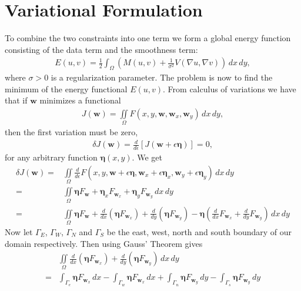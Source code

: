 \chapter{Variational Formulation}
To combine the two constraints into one term we form a global energy function consisting of the data term and the smoothness term:
\begin{align}
E(u,v) = \frac{1}{2} \int_\Omega (M(u,v) + \frac{1}{\sigma^2} V(\nabla u, \nabla v)) \, dx \, dy,
\end{align}
where $\sigma > 0$ is a regularization parameter. The problem is now to find the minimum of the energy functional $E(u,v)$. From calculus of variations we have that if $\textbf{w}$ minimizes a functional
\begin{align*}
J(\textbf{w}) = \iint \limits_\Omega F(x,y,\textbf{w},\textbf{w}_x,\textbf{w}_y) \, dx \, dy,
\end{align*} 
then the first variation must be zero,
\begin{align*}
\delta J(\textbf{w}) = \frac{d}{d \epsilon} \left[ J(\textbf{w} + \epsilon \bm{\eta}) \right] = 0,
\end{align*}
for any arbitrary function $\bm{\eta}(x,y)$. We get
\begin{align*}
\delta J(\textbf{w}) =&  \iint \limits_{\Omega} \frac{d}{d \epsilon} F(x,y,\textbf{w} + \epsilon \bm{\eta}, \textbf{w}_x + \epsilon \bm{\eta}_x, \textbf{w}_y + \epsilon \bm{\eta}_y) \, dx \, dy \\
=&  \iint \limits_{\Omega} \bm{\eta} F_\textbf{w} + \bm{\eta}_x F_{\textbf{w}_x} + \bm{\eta}_y F_{\textbf{w}_y} \, dx \, dy \\
=& \iint \limits_{\Omega} \bm{\eta} F_\textbf{w} + \frac{d}{d x} (\bm{\eta} F_{\textbf{w}_x}) + \frac{d }{d y} (\bm{\eta} F_{\textbf{w}_y}) - \bm{\eta} \left( \frac{d}{d x} F_{\textbf{w}_x} + \frac{d }{d y} F_{\textbf{w}_y} \right) \, dx \, dy
\end{align*}
Now let $\Gamma_{E}$, $\Gamma_{W}$, $\Gamma_{N}$ and $\Gamma_{S}$ be the east, west, north and south boundary of our domain respectively. Then using Gauss' Theorem gives
\begin{align*}
& \iint \limits_{\Omega}  \frac{d}{d x} (\bm{\eta} F_{\textbf{w}_x}) + \frac{d }{d y} (\bm{\eta} F_{\textbf{w}_y}) \, dx \, dy \\ 
=  &\int_{\Gamma_{e}} \bm{\eta} F_{\textbf{w}_x} \, dx - \int_{\Gamma_{w}} \bm{\eta} F_{\textbf{w}_x} \, dx + \int_{\Gamma_{n}} \bm{\eta} F_{\textbf{w}_y} \, dy - \int_{\Gamma_{s}} \bm{\eta} F_{\textbf{w}_y} \, dy
\end{align*}
